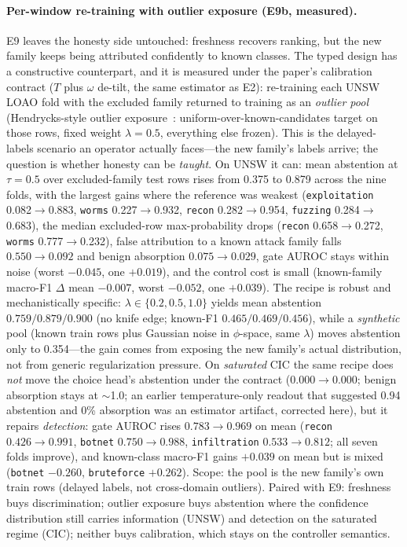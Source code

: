 \documentclass[sigconf,anonymous=false]{acmart}
\begin{document}
\paragraph{Per-window re-training with outlier exposure (E9b, measured).} E9 leaves the honesty side untouched: freshness recovers ranking, but the new family keeps being attributed confidently to known classes. The typed design has a constructive counterpart, and it is measured under the paper's calibration contract ($T$ plus $\omega$ de-tilt, the same estimator as E2): re-training each UNSW LOAO fold with the excluded family returned to training as an \emph{outlier pool} (Hendrycks-style outlier exposure~\cite{hendrycks2019oe}: uniform-over-known-candidates target on those rows, fixed weight $\lambda{=}0.5$, everything else frozen). This is the delayed-labels scenario an operator actually faces---the new family's labels arrive; the question is whether honesty can be \emph{taught}. On UNSW it can: mean abstention at $\tau{=}0.5$ over excluded-family test rows rises from 0.375 to 0.879 across the nine folds, with the largest gains where the reference was weakest (\texttt{exploitation} 0.082$\to$0.883, \texttt{worms} 0.227$\to$0.932, \texttt{recon} 0.282$\to$0.954, \texttt{fuzzing} 0.284$\to$0.683), the median excluded-row max-probability drops (\texttt{recon} 0.658$\to$0.272, \texttt{worms} 0.777$\to$0.232), false attribution to a known attack family falls $0.550\to0.092$ and benign absorption $0.075\to0.029$, gate AUROC stays within noise (worst $-0.045$, one $+0.019$), and the control cost is small (known-family macro-F1 $\Delta$ mean $-0.007$, worst $-0.052$, one $+0.039$). The recipe is robust and mechanistically specific: $\lambda\in\{0.2,0.5,1.0\}$ yields mean abstention $0.759/0.879/0.900$ (no knife edge; known-F1 $0.465/0.469/0.456$), while a \emph{synthetic} pool (known train rows plus Gaussian noise in $\phi$-space, same $\lambda$) moves abstention only to 0.354---the gain comes from exposing the new family's actual distribution, not from generic regularization pressure. On \emph{saturated} CIC the same recipe does \emph{not} move the choice head's abstention under the contract ($0.000\to0.000$; benign absorption stays at $\sim$1.0; an earlier temperature-only readout that suggested 0.94 abstention and 0\% absorption was an estimator artifact, corrected here), but it repairs \emph{detection}: gate AUROC rises $0.783\to0.969$ on mean (\texttt{recon} $0.426\to0.991$, \texttt{botnet} $0.750\to0.988$, \texttt{infiltration} $0.533\to0.812$; all seven folds improve), and known-class macro-F1 gains $+0.039$ on mean but is mixed (\texttt{botnet} $-0.260$, \texttt{bruteforce} $+0.262$). Scope: the pool is the new family's own train rows (delayed labels, not cross-domain outliers). Paired with E9: freshness buys discrimination; outlier exposure buys abstention where the confidence distribution still carries information (UNSW) and detection on the saturated regime (CIC); neither buys calibration, which stays on the controller semantics.



\end{document}
